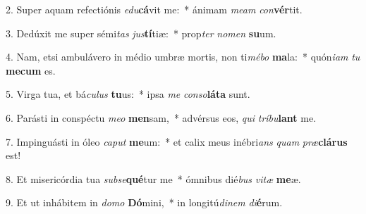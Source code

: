 2. Super aquam refectiónis \textit{e}\textit{du}\textbf{cá}vit me:~*  ánimam \textit{me}\textit{am} \textit{con}\textbf{vér}tit.\

3. Dedúxit me super sémi\textit{tas} \textit{jus}\textbf{tí}tiæ:~*  prop\textit{ter} \textit{no}\textit{men} \textbf{su}um.\

4. Nam, etsi ambulávero in médio umbræ mortis, non ti\textit{mé}\textit{bo} \textbf{ma}la:~*  quón\textit{i}\textit{am} \textit{tu} \textbf{me}\textbf{cum} es.\

5. Virga tua, et bá\textit{cu}\textit{lus} \textbf{tu}us:~*  ipsa \textit{me} \textit{con}\textit{so}\textbf{lá}\textbf{ta} sunt.\

6. Parásti in conspéctu \textit{me}\textit{o} \textbf{men}sam,~*  advérsus eos, \textit{qui} \textit{trí}\textit{bu}\textbf{lant} me.\

7. Impinguásti in óleo \textit{ca}\textit{put} \textbf{me}um:~*  et calix meus inébri\textit{ans} \textit{quam} \textit{præ}\textbf{clá}\textbf{rus} est!\

8. Et misericórdia tua \textit{sub}\textit{se}\textbf{qué}tur me~*  ómnibus dié\textit{bus} \textit{vi}\textit{tæ} \textbf{me}æ.\

9. Et ut inhábitem in \textit{do}\textit{mo} \textbf{Dó}mini,~*  in longitú\textit{di}\textit{nem} \textit{di}\textbf{é}rum.\

